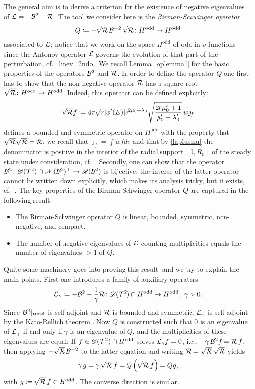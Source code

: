 \documentclass[11pt]{article}
\begin{document}
The general aim is to derive a criterion for the existence of negative
eigenvalues of ${\cal L}=-{\cal B}^2-{{\cal R}}$. The tool we consider here is
the {\em Birman-Schwinger operator}
\begin{equation} \label{Qdef}
  Q\coloneqq-\sqrt{{{\cal R}}}\,{\cal B}^{-2}\,\sqrt{{{\cal R}}}\colon H^\mathrm{odd}\to H^\mathrm{odd}
\end{equation}
associated to ${\cal L}$; notice that we work on the space
$H^\mathrm{odd}$ of odd-in-$v$
functions since the Antonov operator ${\cal L}$ governs the evolution
of that part of the perturbation, cf.~\eqref{linev_2ndo}.
We recall Lemma~\ref{oplemma1} for the basic properties of the operators
${\cal B}^2$ and ${{\cal R}}$. In order to define the operator $Q$ one first has
to show that the
non-negative operator ${{\cal R}}$ has a square root
$\sqrt{{{\cal R}}}\colon H^\mathrm{odd}\to H^\mathrm{odd}$.
Indeed, this operator can be defined explicitly:
\begin{equation}\label{sqrtRdef}
  \sqrt{{{\cal R}}}f\coloneqq4\pi \sqrt{r} |\phi'(E)| e^{2\mu_0+\lambda_0}
  \sqrt{\frac{2r\mu_0'+1}{\mu_0'+\lambda_0'}} \, w \jmath_f
\end{equation}
defines a bounded and symmetric operator on $H^\mathrm{odd}$ with the
property that $\sqrt{{{\cal R}}}\sqrt{{{\cal R}}} = {{\cal R}}$; we recall that
$\jmath_f=\int w f dv$ and that by \eqref{laplusmu} the denominator is positive
in the interior of the radial support $[0,R_0]$
of the steady state under consideration,
cf.~\cite[Lemma~5.15]{GueStrRe}.
Secondly, one can show that the operator
${\cal B}^2 \colon {\mathscr D}({\cal T}^2) \cap {\mathscr N}({\cal B}^2)^\bot  \to {\mathscr R}({\cal B}^2)$
is bijective; the inverse of the latter operator cannot be written down
explicitly, which makes its analysis tricky, but it exists,
cf.~\cite[Prop.~5.14]{GueStrRe}.
The key properties of the
Birman-Schwinger operator $Q$ are captured in the following result.
%
%
\begin{proposition}\label{Qprop}
  \begin{itemize}
  \item[(a)]
    The Birman-Schwinger operator $Q$ is linear, bounded, symmetric,
    non-negative, and compact.
  \item[(b)]
    The number of negative eigenvalues of ${\cal L}$
    counting multiplicities equals the number of eigenvalues $>1$ of $Q$.
  \end{itemize}  
\end{proposition}
%
%
Quite some machinery goes into proving this result, and we try
to explain the main points.
First one introduces a family of auxiliary operators
\[
{\cal L}_\gamma\coloneqq-{\cal B}^2-\frac1\gamma{{\cal R}}\colon
{\mathscr D}({\cal T}^2)\cap H^\mathrm{odd}\to H^\mathrm{odd},\ \gamma>0.
\]
Since ${\cal B}^2|_{H^\mathrm{odd}}$ is self-adjoint and ${{\cal R}}$ is bounded and symmetric,
${\cal L}_\gamma$ is self-adjoint by the Kato-Rellich theorem \cite[Thm.~X.12]{ReSi2}.
Now $Q$ is constructed such that
$0$ is an eigenvalue of ${\cal L}_\gamma$ if and only if
$\gamma$ is an eigenvalue of $Q$, and the multiplicities of
these eigenvalues are equal:
If $f\in {\mathscr D}({\cal T}^2)\cap H^\mathrm{odd}$ solves ${\cal L}_\gamma f=0$, i.e.,
$-\gamma\,{\cal B}^2f={{\cal R}}\,f$, then applying $-\sqrt{{{\cal R}}}\,{\cal B}^{-2}$ to the latter
equation and writing ${{\cal R}}=\sqrt{{{\cal R}}}\,\sqrt{{{\cal R}}}$ yields
\[
\gamma\,g = \gamma\,\sqrt{{{\cal R}}}\,f= Q\left(\sqrt{{{\cal R}}}\,f\right) = Qg,
\]
with $g\coloneqq\sqrt{{{\cal R}}}\,f \in H^\mathrm{odd}$. 
The converse direction is similar.
\end{document}
